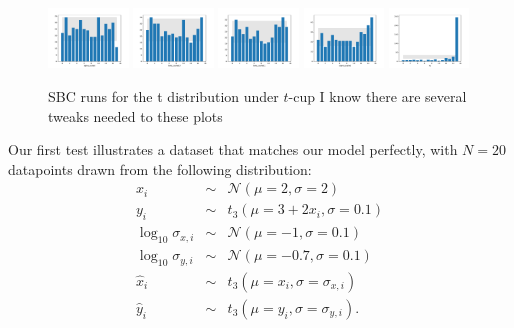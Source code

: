 \documentclass[fleqn,usenatbib]{mnras}
\begin{document}
\begin{figure}
    \includegraphics[width=0.19\textwidth]{graphics/sbc_t/alpha_scaled.pdf}
    \includegraphics[width=0.19\textwidth]{graphics/sbc_t/beta_scaled.0.pdf}
    \includegraphics[width=0.19\textwidth]{graphics/sbc_t/beta_scaled.1.pdf}
    \includegraphics[width=0.19\textwidth]{graphics/sbc_t/sigma_scaled.pdf}
    \includegraphics[width=0.19\textwidth]{graphics/sbc_t/nu.pdf}
    \caption{SBC runs for the t distribution under $t$-cup {\color{red} I know
    there are several tweaks needed to these plots}}
    \label{fig:results.t.sbc}
\end{figure}

Our first test illustrates a dataset that matches our model perfectly, with $N =
20$ datapoints drawn from the following distribution:
\begin{eqnarray}
    x_i &\sim& \mathcal N (\mu = 2, \sigma = 2) \\
    y_i &\sim& t_{3} (\mu = 3 + 2 x_i, \sigma = 0.1) \\
    \log_{10} \sigma_{x, i} &\sim& \mathcal N (\mu = -1, \sigma = 0.1) \\
    \log_{10} \sigma_{y, i} &\sim& \mathcal N (\mu = -0.7, \sigma = 0.1) \\
    \hat{x}_i &\sim& t_{3} (\mu = x_i, \sigma = \sigma_{x, i}) \\
    \hat{y}_i &\sim& t_{3} (\mu = y_i, \sigma = \sigma_{y, i}).
\end{eqnarray}
\end{document}
